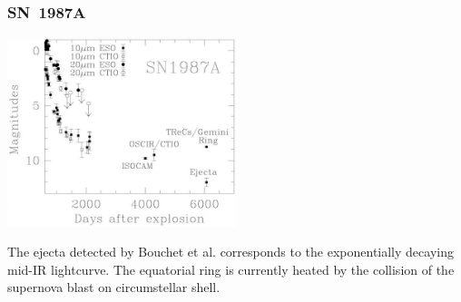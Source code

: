 \begin{frame}\frametitle{SN~1987A}

\begin{center}
\includegraphics[width=0.5\textwidth,height=!]{./D/SN1987A_lightcurve.jpg}
\end{center}
\vfill The ejecta detected by Bouchet et al. corresponds to the
exponentially decaying mid-IR lightcurve. The equatorial ring is
currently heated by the collision of the supernova blast on
circumstellar shell.

\end{frame}
